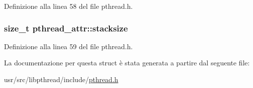 Definizione alla linea 58 del file pthread.\+h.

\hypertarget{structpthread__attr_a8b8eaabf2bc9b4cec33d7764bbb115d9}{
\subsubsection[{stacksize}]{\setlength{\rightskip}{0pt plus 5cm}size\+\_\+t pthread\+\_\+attr\+::stacksize}}\label{structpthread__attr_a8b8eaabf2bc9b4cec33d7764bbb115d9}


Definizione alla linea 59 del file pthread.\+h.



La documentazione per questa struct è stata generata a partire dal seguente file\+:\begin{DoxyCompactItemize}
\item 
usr/src/libpthread/include/\hyperlink{pthread_8h}{pthread.\+h}\end{DoxyCompactItemize}
